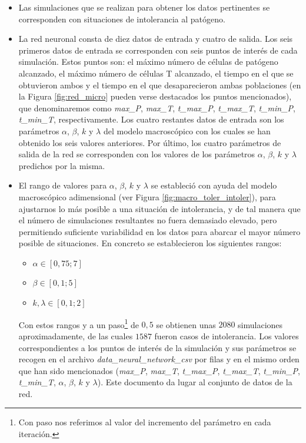 \begin{itemize}
	\item Las simulaciones que se realizan para obtener los datos pertinentes se corresponden con situaciones de intolerancia al patógeno.
	
	\item La red neuronal consta de diez datos de entrada y cuatro de salida. Los seis primeros datos de entrada se corresponden con seis puntos de interés de cada simulación. Estos puntos son: el máximo número de células de patógeno alcanzado, el máximo número de células T alcanzado, el tiempo en el que se obtuvieron ambos y el tiempo en el que desaparecieron ambas poblaciones (en la Figura \ref{fig:red_micro} pueden verse destacados los puntos mencionados), que denominaremos como \textit{max\_P}, \textit{max\_T}, \textit{t\_max\_P}, \textit{t\_max\_T}, \textit{t\_min\_P}, \textit{t\_min\_T}, respectivamente. Los cuatro restantes datos de entrada son los parámetros $\alpha$, $\beta$, $k$ y $\lambda$ del modelo macroscópico con los cuales se han obtenido los seis valores anteriores. Por último, los cuatro parámetros de salida de la red se corresponden con los valores de los parámetros $\alpha$, $\beta$, $k$ y $\lambda$ predichos por la misma.
	
	\item El rango de valores para $\alpha$, $\beta$, $k$ y $\lambda$ se estableció con ayuda del modelo macroscópico adimensional (ver Figura \ref{fig:macro_toler_intoler}), para ajustarnos lo más posible a una situación de intolerancia, y de tal manera que el número de simulaciones resultantes no fuera demasiado elevado, pero permitiendo suficiente variabilidad en los datos para abarcar el mayor número posible de situaciones. En concreto se establecieron los siguientes rangos:
	
	\begin{itemize}
		\item $\alpha \in  [0,75;7]$
		\item $\beta \in [0,1;5]$
		\item $k, \lambda \in [0,1;2]$
	\end{itemize}
	
	Con estos rangos y a un paso\footnote{Con paso nos referimos al valor del incremento del parámetro en cada iteración.} de $0,5$ se obtienen unas $2080$ simulaciones aproximadamente, de las cuales $1587$ fueron casos de intolerancia. Los valores correspondientes a los puntos de interés de la simulación y sus parámetros se recogen en el archivo \textit{data\_neural\_network\_csv} por filas y en el mismo orden que han sido mencionados (\textit{max\_P}, \textit{max\_T}, \textit{t\_max\_P}, \textit{t\_max\_T}, \textit{t\_min\_P}, \textit{t\_min\_T}, $\alpha$, $\beta$, $k$ y $\lambda$). Este documento da lugar al conjunto de datos de la red.
	

\end{itemize}
